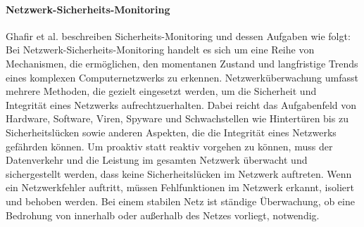 \paragraph{Netzwerk-Sicherheits-Monitoring}
Ghafir et al. \cite{ghafir_network_2015} beschreiben Sicherheits-Monitoring und dessen Aufgaben wie folgt: %
Bei Netzwerk-Sicherheits-Monitoring handelt es sich um eine Reihe von Mechanismen, die ermöglichen, den momentanen Zustand und langfristige Trends eines komplexen Computernetzwerks zu erkennen. Netzwerküberwachung umfasst mehrere Methoden, die gezielt eingesetzt werden, um die Sicherheit und Integrität eines Netzwerks aufrechtzuerhalten. Dabei reicht das Aufgabenfeld von Hardware, Software, Viren, Spyware und Schwachstellen wie Hintertüren bis zu Sicherheitslücken sowie anderen Aspekten, die die Integrität eines Netzwerks gefährden können. Um proaktiv statt reaktiv vorgehen zu können, muss der Datenverkehr und die Leistung im gesamten Netzwerk überwacht und sichergestellt werden, dass keine Sicherheitslücken im Netzwerk auftreten. Wenn ein Netzwerkfehler auftritt, müssen Fehlfunktionen im Netzwerk erkannt, isoliert und behoben werden. Bei einem stabilen Netz ist ständige Überwachung, ob eine Bedrohung von innerhalb oder außerhalb des Netzes vorliegt, notwendig.
